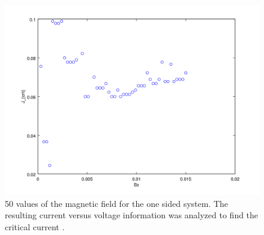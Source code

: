 \begin{figure}[htbp]
\begin{center}
\includegraphics[scale=.50]{oneSideBz.png}
\caption{ 50 values of the magnetic field for the one sided system. The resulting current versus voltage information was analyzed to find the critical current .  }
\label{oneBz}
\end{center}
\end{figure}



